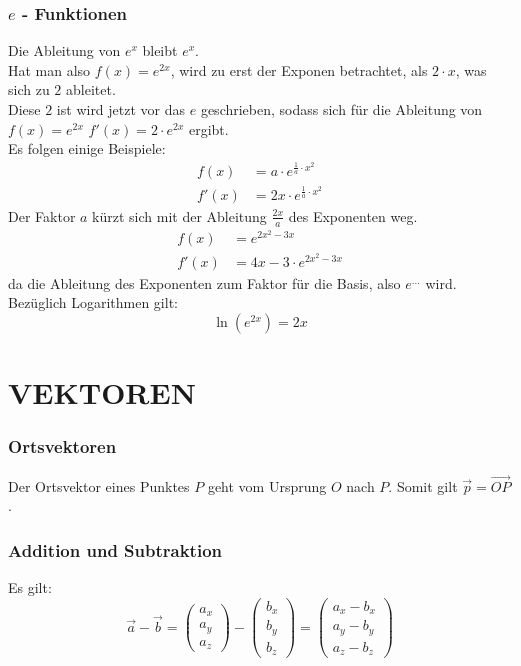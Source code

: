 \documentclass[a4paper,12pt]{article}
\begin{document}
\section{$e$ - Funktionen}
Die Ableitung von $e^x$ bleibt $e^x$.\\
Hat man also $f(x) = e^{2x}$, wird zu erst der Exponen betrachtet, als $2 \cdot x$, was sich zu $2$ ableitet.\\
Diese $2$ ist wird jetzt vor das $e$ geschrieben, sodass sich für die Ableitung von $f(x) = e^{2x}$ $f'(x) = 2 \cdot e^{2x}$ ergibt.\\
Es folgen einige Beispiele:\\
\begin{equation*}
\begin{split}
f(x) & = a \cdot e^{\frac{1}{a} \cdot x^2}\\
f'(x) & = 2x \cdot e^{\frac{1}{a} \cdot x^2}
\end{split}
\end{equation*}
Der Faktor $a$ kürzt sich mit der Ableitung $\frac{2x}{a}$ des Exponenten weg.
\begin{equation*}
\begin{split}
f(x) & = e^{2x^2-3x}\\
f'(x) & = 4x - 3 \cdot e^{2x^2-3x}
\end{split}
\end{equation*}
da die Ableitung des Exponenten zum Faktor für die Basis, also $e^{...}$ wird.\\
Bezüglich Logarithmen gilt:$$\ln{(e^{2x})} = 2x$$
\pagebreak
\part{VEKTOREN}
\section{Ortsvektoren}
Der Ortsvektor eines Punktes $P$ geht vom Ursprung $O$ nach $P$. Somit gilt $\vec{p} = \vec{OP}$.
\section{Addition und Subtraktion}
Es gilt:
$$\vec{a} - \vec{b} = \begin{pmatrix}a_x\\a_y\\a_z\end{pmatrix} - \begin{pmatrix}b_x\\b_y\\b_z\end{pmatrix} = \begin{pmatrix}a_x - b_x\\a_y - b_y\\a_z - b_z\end{pmatrix}$$
\end{document}
